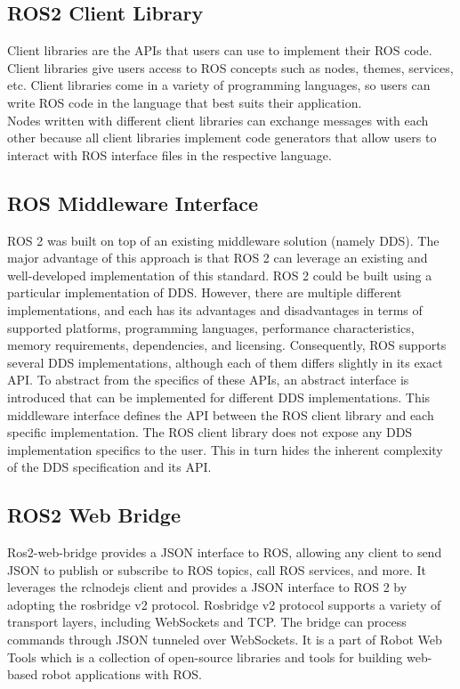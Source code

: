 	\subsection{ROS2 Client Library}
	\label{Grundlagen:ROS2:ROS2ClientLibrary}
	Client libraries are the APIs that users can use to implement their ROS code. Client libraries give users access to ROS concepts such as nodes, themes, services, etc. Client libraries come in a variety of programming languages, so users can write ROS code in the language that best suits their application.\\

	Nodes written with different client libraries can exchange messages with each other because all client libraries implement code generators that allow users to interact with ROS interface files in the respective language.

	\subsection{ROS Middleware Interface}
	\label{Grundlagen:ROS2:ROSMiddlewareInterface}
	ROS 2 was built on top of an existing middleware solution (namely DDS). The major advantage of this approach is that ROS 2 can leverage an existing and well-developed implementation of this standard. ROS 2 could be built using a particular implementation of DDS. However, there are multiple different implementations, and each has its advantages and disadvantages in terms of supported platforms, programming languages, performance characteristics, memory requirements, dependencies, and licensing. Consequently, ROS supports several DDS implementations, although each of them differs slightly in its exact API. To abstract from the specifics of these APIs, an abstract interface is introduced that can be implemented for different DDS implementations. This middleware interface defines the API between the ROS client library and each specific implementation. The ROS client library does not expose any DDS implementation specifics to the user. This in turn hides the inherent complexity of the DDS specification and its API.\cite{ros2OnMW}
	

	\subsection{ROS2 Web Bridge}
	\label{Grundlagen:ROS2:2WebBridge}
	Ros2-web-bridge provides a JSON interface to ROS, allowing any client to send JSON to publish or subscribe to ROS topics, call ROS services, and more. It leverages the rclnodejs client and provides a JSON interface to ROS 2 by adopting the rosbridge v2 protocol. Rosbridge v2 protocol supports a variety of transport layers, including WebSockets and TCP. The bridge can process commands through JSON tunneled over WebSockets. It is a part of  Robot Web Tools which is a collection of open-source libraries and tools for building web-based robot applications with ROS.\cite{ros2OnWB}

